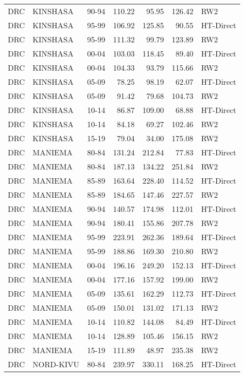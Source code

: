 \begin{longtable}{lllrrrl}
  DRC & KINSHASA & 90-94 & 110.22 & 95.95 & 126.42 & RW2 \\ 
  DRC & KINSHASA & 95-99 & 106.92 & 125.85 & 90.55 & HT-Direct \\ 
  DRC & KINSHASA & 95-99 & 111.32 & 99.79 & 123.89 & RW2 \\ 
  DRC & KINSHASA & 00-04 & 103.03 & 118.45 & 89.40 & HT-Direct \\ 
  DRC & KINSHASA & 00-04 & 104.33 & 93.79 & 115.66 & RW2 \\ 
  DRC & KINSHASA & 05-09 & 78.25 & 98.19 & 62.07 & HT-Direct \\ 
  DRC & KINSHASA & 05-09 & 91.42 & 79.68 & 104.73 & RW2 \\ 
  DRC & KINSHASA & 10-14 & 86.87 & 109.00 & 68.88 & HT-Direct \\ 
  DRC & KINSHASA & 10-14 & 84.18 & 69.27 & 102.46 & RW2 \\ 
  DRC & KINSHASA & 15-19 & 79.04 & 34.00 & 175.08 & RW2 \\ 
  DRC & MANIEMA & 80-84 & 131.24 & 212.84 & 77.83 & HT-Direct \\ 
  DRC & MANIEMA & 80-84 & 187.13 & 134.22 & 251.84 & RW2 \\ 
  DRC & MANIEMA & 85-89 & 163.64 & 228.40 & 114.52 & HT-Direct \\ 
  DRC & MANIEMA & 85-89 & 184.65 & 147.46 & 227.57 & RW2 \\ 
  DRC & MANIEMA & 90-94 & 140.57 & 174.98 & 112.01 & HT-Direct \\ 
  DRC & MANIEMA & 90-94 & 180.41 & 155.86 & 207.78 & RW2 \\ 
  DRC & MANIEMA & 95-99 & 223.91 & 262.36 & 189.64 & HT-Direct \\ 
  DRC & MANIEMA & 95-99 & 188.86 & 169.30 & 210.80 & RW2 \\ 
  DRC & MANIEMA & 00-04 & 196.16 & 249.20 & 152.13 & HT-Direct \\ 
  DRC & MANIEMA & 00-04 & 177.16 & 157.92 & 199.00 & RW2 \\ 
  DRC & MANIEMA & 05-09 & 135.61 & 162.29 & 112.73 & HT-Direct \\ 
  DRC & MANIEMA & 05-09 & 150.01 & 131.02 & 171.13 & RW2 \\ 
  DRC & MANIEMA & 10-14 & 110.82 & 144.08 & 84.49 & HT-Direct \\ 
  DRC & MANIEMA & 10-14 & 128.89 & 105.46 & 156.15 & RW2 \\ 
  DRC & MANIEMA & 15-19 & 111.89 & 48.97 & 235.38 & RW2 \\ 
  DRC & NORD-KIVU & 80-84 & 239.97 & 330.11 & 168.25 & HT-Direct \\ 

\end{longtable}
